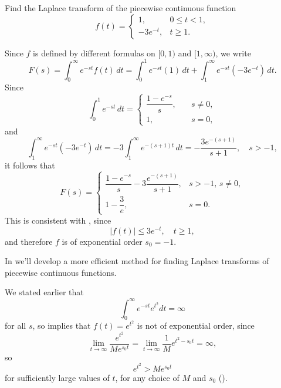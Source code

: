 \begin{example}\label{example:8.1.10}
Find the Laplace transform of the piecewise continuous function
\[
f(t)=\begin{cases}
1,&0\le t<1,\\
-3e^{-t},&t\ge1.
\end{cases}
\]
\end{example}

\begin{solution}
Since $f$ is defined by different formulas
on $[0,1)$ and $[1,\infty)$, we write
\[
 F(s)=\int_0^\infty e^{-st} f(t)\,dt
=\int_0^1e^{-st}(1)\,dt+\int_1^\infty
e^{-st}(-3e^{-t})\,dt.
\]
Since
\[
\int_0^1e^{-st}\,dt=\begin{cases}
\dfrac{1-e^{-s}}{s},&\quad s\ne0,\\
1,&\quad s=0,
\end{cases}
\]
 and
\[
\int_1^\infty e^{-st}(-3e^{-t})\,dt=-3\int_1^\infty
e^{-(s+1)t}\,dt=-\frac{3e^{-(s+1)}}{s+1},\quad s>-1,
\]
it follows that
\[
F(s)=\begin{cases}
\dfrac{1-e^{-s}}{s}-3\dfrac{e^{-(s+1)}}{s+1},&s>-1,\,s\ne0,\\
1-\dfrac{3}{e},&s=0.
\end{cases}
\]
This is consistent with , since
\[
|f(t)|\le 3e^{-t},\quad  t\ge 1,
\]
and therefore $f$ is of exponential order $s_0=-1$.
\end{solution}

\begin{remark*}
In  we'll develop a more efficient
method for finding Laplace transforms of piecewise continuous
functions.
\end{remark*}

\begin{example}\label{example:8.1.11}
We stated  earlier that
\[
\int_0^\infty e^{-st} e^{t^2} dt=\infty
\]
for all $s$, so  implies that $f(t)=e^{t^2}$
is not  of exponential order, since
\[
\lim_{t\to\infty}\frac{e^{t^2}}{Me^{s_0t}}=\lim_{t\to\infty} \frac{1}{M} e^{t^2-s_0t}=\infty,
\]
so
\[
e^{t^2}>Me^{s_0t}
\]
for sufficiently large values of $t$, for any choice of $M$ and $s_{0}$
().
\end{example}

\exercises

